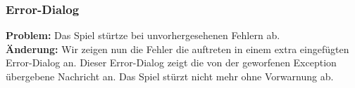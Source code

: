 \subsubsection*{Error-Dialog}
\textbf{Problem:} Das Spiel stürtze bei unvorhergesehenen Fehlern ab.\\

\textbf{Änderung:} Wir zeigen nun die Fehler die auftreten in einem extra eingefügten Error-Dialog an. Dieser Error-Dialog zeigt die von der geworfenen Exception übergebene Nachricht an. Das Spiel stürzt nicht mehr ohne Vorwarnung ab.\\

